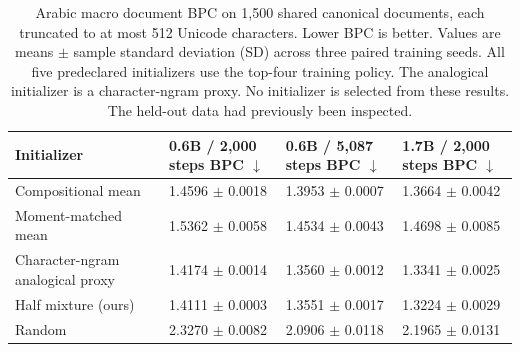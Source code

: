 \begin{table}[t]
\centering
\small
\setlength{\tabcolsep}{4pt}
\begin{tabular}{@{}llll@{}}
\toprule
Initializer & \shortstack{0.6B / 2,000 steps\\BPC $\downarrow$} & \shortstack{0.6B / 5,087 steps\\BPC $\downarrow$} & \shortstack{1.7B / 2,000 steps\\BPC $\downarrow$} \\
\midrule
Compositional mean & 1.4596 $\pm$ 0.0018 & 1.3953 $\pm$ 0.0007 & 1.3664 $\pm$ 0.0042 \\
Moment-matched mean & 1.5362 $\pm$ 0.0058 & 1.4534 $\pm$ 0.0043 & 1.4698 $\pm$ 0.0085 \\
Character-ngram analogical proxy & 1.4174 $\pm$ 0.0014 & 1.3560 $\pm$ 0.0012 & 1.3341 $\pm$ 0.0025 \\
Half mixture (ours) & 1.4111 $\pm$ 0.0003 & 1.3551 $\pm$ 0.0017 & 1.3224 $\pm$ 0.0029 \\
Random & 2.3270 $\pm$ 0.0082 & 2.0906 $\pm$ 0.0118 & 2.1965 $\pm$ 0.0131 \\
\bottomrule
\end{tabular}
\caption{Arabic macro document BPC on 1,500 shared canonical documents, each truncated to at most 512 Unicode characters. Lower BPC is better. Values are means $\pm$ sample standard deviation (SD) across three paired training seeds. All five predeclared initializers use the top-four training policy. The analogical initializer is a character-ngram proxy. No initializer is selected from these results. The held-out data had previously been inspected. }
\label{tab:rebuttal-initializer-ar}
\end{table}
